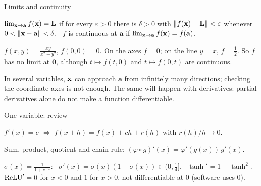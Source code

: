 \documentclass[aspectratio=1610,11pt]{beamer}
\begin{document}
\begin{frame}{Limits and continuity}
    \begin{definition}
        \small $\lim_{\mathbf{x} \to \mathbf{a}} f(\mathbf{x}) = \mathbf{L}$ if for every $\varepsilon > 0$ there is $\delta > 0$ with $\lVert f(\mathbf{x}) - \mathbf{L} \rVert < \varepsilon$ whenever $0 < \lVert \mathbf{x} - \mathbf{a} \rVert < \delta$. \ $f$ is continuous at $\mathbf{a}$ if $\lim_{\mathbf{x} \to \mathbf{a}} f(\mathbf{x}) = f(\mathbf{a})$.
    \end{definition}
    \begin{example}[][ex:xy]
        \small $f(x, y) = \frac{xy}{x^2 + y^2}$, $f(0, 0) = 0$. On the axes $f = 0$; on the line $y = x$, $f = \frac{1}{2}$. So $f$ has no limit at $\mathbf{0}$, although $t \mapsto f(t, 0)$ and $t \mapsto f(0, t)$ are continuous.
    \end{example}
    \small
    In several variables, $\mathbf{x}$ can approach $\mathbf{a}$ from infinitely many directions; checking the coordinate axes is not enough. The same will happen with derivatives: partial derivatives alone do not make a function differentiable.
\end{frame}

\begin{frame}{One variable: review}
    \small
    \begin{proposition}
        $f'(x) = c$ $\iff$ $f(x + h) = f(x) + ch + r(h)$ with $r(h)/h \to 0$.
    \end{proposition}
    Sum, product, quotient and chain rule: $(\varphi \circ g)'(x) = \varphi'(g(x))\,g'(x)$.
    \begin{example}
        \small $\sigma(x) = \frac{1}{1 + e^{-x}}$: \ $\sigma'(x) = \sigma(x)(1 - \sigma(x)) \in (0, \frac{1}{4}]$. \ $\tanh' = 1 - \tanh^2$. \ $\operatorname{ReLU}' = 0$ for $x < 0$ and $1$ for $x > 0$, not differentiable at $0$ (software uses $0$).
    \end{example}
\end{frame}
\end{document}
